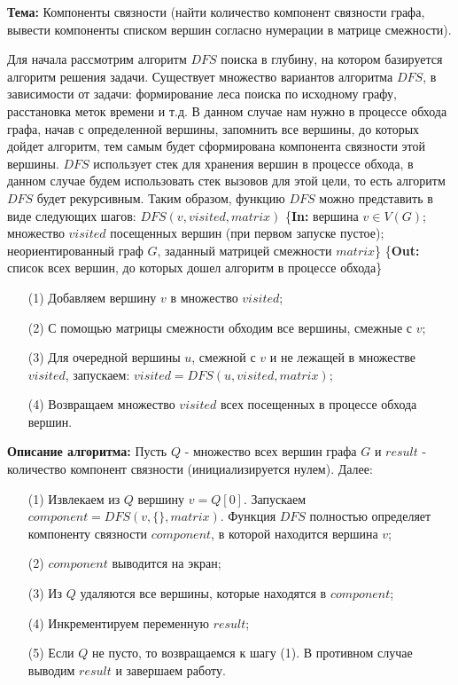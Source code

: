 \documentclass[a4paper,20pt]{article}
\numberwithin{equation}{subsubsection}
\numberwithin{definition}{subsubsection}
\begin{document}
	\pagestyle{fancy}

	\noindent\textbf{Тема:} Компоненты связности (найти количество компонент связности графа, вывести компоненты списком вершин согласно нумерации в матрице смежности).
	\newline

	\noindent Для начала рассмотрим алгоритм $DFS$ поиска в глубину, на котором базируется алгоритм решения задачи. Существует множество вариантов алгоритма $DFS$, в зависимости от задачи: формирование леса поиска по исходному графу, расстановка меток времени и т.д. В данном случае нам нужно в процессе обхода графа, начав с определенной вершины, запомнить все вершины, до которых дойдет алгоритм, тем самым будет сформирована компонента связности этой вершины.
	$DFS$ использует стек для хранения вершин в процессе обхода, в данном случае будем использовать стек вызовов для этой цели, то есть алгоритм $DFS$ будет рекурсивным. Таким образом, функцию $DFS$ можно представить в виде следующих шагов:
	\newline
	\newline
	$DFS(v, visited, matrix)$
	\newline
	\newline
	\{\textbf{In:} вершина $v \in V(G)$; множество $visited$ посещенных вершин (при первом запуске пустое); неориентированный граф $G$, заданный матрицей смежности $matrix$\}
	\newline
	\{\textbf{Out:} список всех вершин, до которых дошел алгоритм в процессе обхода\}

	\begin{enumerate}
		\item[(1)] Добавляем вершину $v$ в множество $visited$;
		\item[(2)] С помощью матрицы смежности обходим все вершины, смежные с $v$;
		\item[(3)] Для очередной вершины $u$, смежной с $v$ и не лежащей в множестве $visited$, запускаем: $visited = DFS(u, visited, matrix)$;
		\item[(4)] Возвращаем множество $visited$ всех посещенных в процессе обхода вершин.
	\end{enumerate}

	\noindent\textbf{Описание алгоритма:} Пусть $Q$ - множество всех вершин графа $G$ и $result$ - количество компонент связности (инициализируется нулем). Далее:
	\begin{enumerate}
		\item[(1)] Извлекаем из $Q$ вершину $v = Q[0]$. Запускаем $component = DFS(v, \{\}, matrix)$. Функция $DFS$ полностью определяет компоненту связности $component$, в которой находится вершина $v$;
		\item[(2)] $component$ выводится на экран;
		\item[(3)] Из $Q$ удаляются все вершины, которые находятся в $component$;
		\item[(4)] Инкрементируем переменную $result$;
		\item[(5)] Если $Q$ не пусто, то возвращаемся к шагу (1). В противном случае выводим $result$ и завершаем работу.
	\end{enumerate}
	
\end{document}

